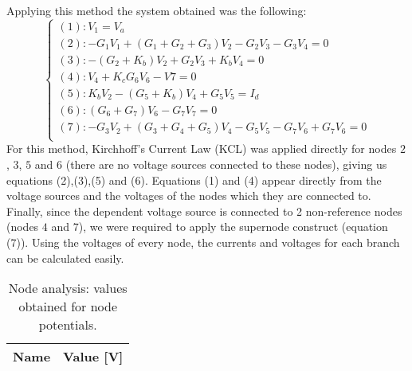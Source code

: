 Applying this method the system obtained was the following:
\begin{equation}
  \begin{cases}
    \left(1\right): V_{1}=V_{a}                                                                        \\
    \left(2\right): -G_{1}V_{1}+\left(G_{1}+G_{2}+G_{3}\right)V_{2}-G_{2}V_{3}-G_{3}V_{4}=0            \\
    \left(3\right): -\left(G_{2}+K_{b}\right)V_{2}+G_{2}V_{3}+K_{b}V_{4}=0                             \\
    \left(4\right): V_{4}+K_{c}G_{6}V_{6}-V{7}=0                                                       \\
    \left(5\right): K_{b}V_{2}-\left(G_{5}+K_{b}\right)V_{4} +G_{5}V_{5}=I_{d}                       \\
    \left(6\right): \left(G_{6}+G_{7}\right)V_{6}-G_{7}V_{7}=0                                         \\
    \left(7\right): -G_{3}V_{2}+\left(G_{3}+G_{4}+G_{5}\right)V_{4}-G_{5}V_{5}-G_{7}V_{6}+G_{7}V_{6}=0 \\
  \end{cases}
\end{equation}
For this method, Kirchhoff's Current Law (KCL) was applied directly for nodes $2$, $3$, $5$ and $6$ (there are no voltage sources connected to these nodes), giving us equations (2),(3),(5) and (6). Equations (1) and (4) appear directly from the voltage sources  and the voltages of the nodes which they are connected to. Finally, since the dependent voltage source is connected to 2 non-reference nodes (nodes $4$ and $7$), we were required to apply the supernode construct (equation (7)).
Using the voltages of every node, the currents and voltages for each branch can be calculated easily.

\begin{table}[h]
  \centering
  \begin{tabular}{|l|r|}
    \hline
    {\bf Name} & {\bf Value [V]} \\ \hline
    
  \end{tabular}
  \caption{Node analysis: values obtained for node potentials.}
  \label{tab:op2}
\end{table}

